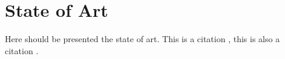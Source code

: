 \chapter{State of Art}\label{stateofart}

Here should be presented the state of art. This is a citation \cite{KenPeffers2007}, this is also a citation \citep{KenPeffers2007}.